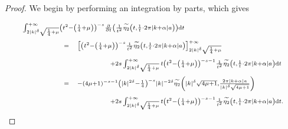 \documentclass{jams-l}
\theoremstyle{definition}
\theoremstyle{remark}
\numberwithin{equation}{section}
\begin{document}
                \begin{proof}
                
                    We begin by performing an integration by parts, which gives
                    
                    \[ \begin{array}{lll}
                            \multicolumn{3}{l}{\scriptstyle \int_{2 \left \vert k \right \vert^{\delta} \sqrt{\frac{1}{4} + \mu}}^{+ \infty} \left( t^2 - \left( \frac{1}{4} + \mu \right) \right)^{-s} \frac{\partial}{\partial t} \left( \frac{1}{t^2} \widetilde{\eta_2} \left( t, \frac{1}{t} \cdot 2 \pi \left \vert k + \alpha \right \vert a \right) \right) \mathrm{d}t} \\[1em]
                            
                            \qquad \qquad & \scriptstyle = & \scriptstyle \left[ \left( t^2 - \left( \frac{1}{4} + \mu \right) \right)^{-s} \frac{1}{t^2} \widetilde{\eta_2} \left( t, \frac{1}{t} \cdot 2 \pi \left \vert k + \alpha \right \vert a \right) \right]_{2 \left \vert k \right \vert^{\delta} \sqrt{\frac{1}{4} + \mu}}^{+ \infty} \\[1em]
                            
                            && \qquad \qquad \scriptstyle + 2s \int_{2 \left \vert k \right \vert^{\delta} \sqrt{\frac{1}{4} + \mu}}^{+ \infty} t \left( t^2 - \left( \frac{1}{4} + \mu \right) \right)^{-s-1} \frac{1}{t^2} \widetilde{\eta_2} \left( t, \frac{1}{t} \cdot 2 \pi \left \vert k + \alpha \right \vert a \right) \mathrm{d}t \\[1em]
                            
                            & \scriptstyle = & \scriptstyle - \left( 4 \mu + 1 \right)^{-s-1} \left( \left \vert k \right \vert^{2 \delta} - \frac{1}{4} \right)^{-s} \left \vert k \right \vert^{-2 \delta} \widetilde{\eta_2} \left( \left \vert k \right \vert^{\delta} \sqrt{4 \mu + 1}, \frac{2 \pi \left \vert k + \alpha \right \vert a}{\left \vert k \right \vert^{\delta} \sqrt{4 \mu + 1}} \right) \\[1em]
                            
                            && \qquad \qquad \scriptstyle + 2s \int_{2 \left \vert k \right \vert^{\delta} \sqrt{\frac{1}{4} + \mu}}^{+ \infty} t \left( t^2 - \left( \frac{1}{4} + \mu \right) \right)^{-s-1} \frac{1}{t^2} \widetilde{\eta_2} \left( t, \frac{1}{t} \cdot 2 \pi \left \vert k + \alpha \right \vert a \right) \mathrm{d}t.
                        \end{array} \]
                    

\end{proof}
\end{document}
